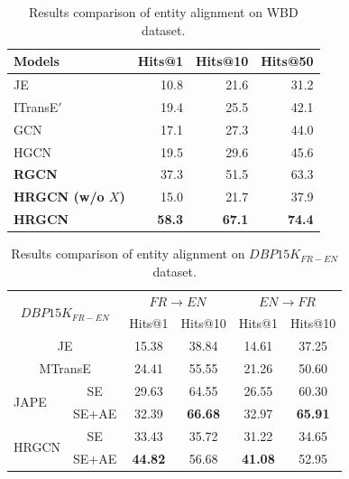 		\begin{table}
		\centering
		\small
		\begin{tabular}{lrrr}
			\toprule
			\bf Models & Hits@1 & Hits@10 & Hits@50 \\
			\midrule
			JE & 10.8 & 21.6 & 31.2 \\
			ITransE$'$ & 19.4 & 25.5 & 42.1 \\
			GCN & 17.1 & 27.3 & 44.0 \\
			HGCN & 19.5 & 29.6 & 45.6 \\
			\bf RGCN & 37.3 & 51.5 & 63.3 \\
			\bf HRGCN (w/o $X$) & 15.0 & 21.7 & 37.9  \\
			\bf HRGCN & \bf 58.3 & \bf 67.1 & \bf 74.4 \\
			\bottomrule
		\end{tabular}
		\caption{Results comparison of entity alignment on WBD dataset.}
		\label{f1}
	\end{table}
		\begin{table}
		\centering
		\scriptsize
		\begin{tabular}{lc|cc|cc}
			\toprule
			\multicolumn{2}{c|}{\multirow{2}{*}{$DBP15K_{FR-EN}$}} & \multicolumn{2}{c|}{$FR \rightarrow EN$} & \multicolumn{2}{c}{$EN \rightarrow FR$} \\
			& & Hits@1 & Hits@10 & Hits@1 & Hits@10 \\
			\midrule
			\multicolumn{2}{c|}{JE} & 15.38 & 38.84 & 14.61 & 37.25 \\
			\midrule
			\multicolumn{2}{c|}{MTransE} & 24.41 & 55.55 & 21.26 & 50.60 \\
			\midrule
			\multirow{2}{*}{JAPE} & SE & 29.63 & 64.55 & 26.55 & 60.30 \\
			& SE+AE & 32.39 & \bf 66.68 & 32.97 & \bf 65.91 \\
			\midrule
			\multirow{2}{*}{HRGCN} & SE & 33.43& 35.72& 31.22& 34.65\\
			& SE+AE & \bf 44.82 & 56.68 &\bf 41.08 & 52.95\\
			\bottomrule
		\end{tabular}
		\caption{Results comparison of entity alignment on $DBP15K_{FR-EN}$ dataset.}
		\label{cross}
	\end{table}
	
	

